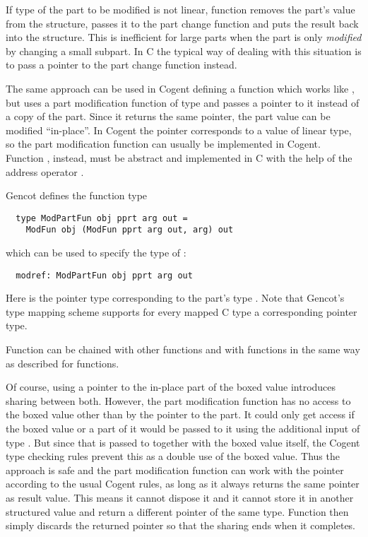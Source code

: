 If type  of the part to be modified is not linear, function  removes the part's value from the structure,
passes it to the part change function and puts the result back into the structure. This is
inefficient for large parts when the part is only \textit{modified} by changing a small subpart.
In C the typical way of dealing with this situation is to pass a pointer to the part change function 
instead. 

The same approach can be used in Cogent defining a function  which works like , but
uses a part modification function of type  and passes a pointer to it instead of a copy of the part. 
Since it returns the same pointer, the part value can be modified ``in-place''.
In Cogent the pointer corresponds to a value of linear type, so the part modification function can usually be 
implemented in Cogent. Function , instead, must be abstract and implemented in C with the help of 
the address operator \code{\&}. 

Gencot defines the function type
\begin{verbatim}
  type ModPartFun obj pprt arg out = 
    ModFun obj (ModFun pprt arg out, arg) out
\end{verbatim}
which can be used to specify the type of :
\begin{verbatim}
  modref: ModPartFun obj pprt arg out
\end{verbatim}
Here  is the pointer type corresponding to the part's type . Note that Gencot's type mapping 
scheme supports for every mapped C type a corresponding pointer type.

Function  can be chained with other  functions and with  functions in the
same way as described for  functions.

Of course, using a pointer to the in-place part of the boxed value introduces sharing between both. However, the 
part modification function has no access to the boxed value other than by the pointer to the part. It could only get
access if the boxed value or a part of it would be passed to it using the additional input of type . But since
that is passed to  together with the boxed value itself, the Cogent type checking rules prevent this
as a double use of the boxed value. Thus the approach is safe and the part modification function can work with the
pointer according to the usual Cogent rules, as long as it always returns the same pointer as result value. This
means it cannot dispose it and it cannot store it in another structured value and return a different pointer of
the same type. Function  then simply discards the returned pointer so that the sharing ends when it
completes.


